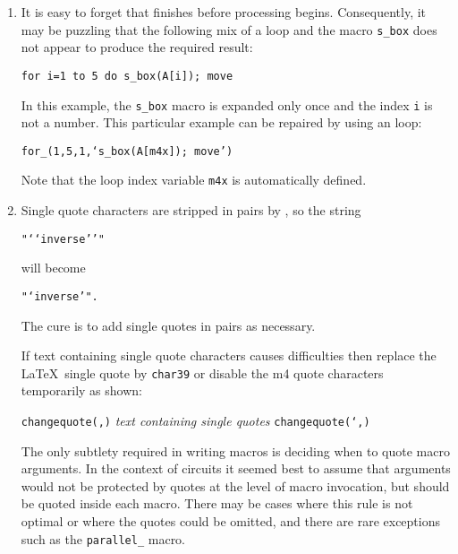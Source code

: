 \begin{enumerate}
{\tt source(0.5)}

\noindent draws a source of length 0.5 units
in the current \pic default direction, which is one of
{\tt right,} {\tt left,} {\tt up,} or {\tt down.}
The best practice is
to specify both the direction and length of an element, thus:

{\tt source(up\_ elen\_).}

The effect of a \linespec argument is independent of any direction
set using the {\tt Point\_} or similar macros. 
To draw an element at an obtuse angle (see ) try,
for example,

{\tt Point\_(45); source(to rvec\_(0.5,0))}

\item 
{}
It is easy to forget that \Mfour finishes before \pic processing
begins. Consequently, it may be puzzling that the following mix of
a \pic loop and the \Mfour macro {\tt s\_box} does not appear to produce
the required result:

{\tt for i=1 to 5 do \lbr s\_box(A[i]); move \rbr}

\noindent In this example, the {\tt s\_box} macro is expanded only once
and the index {\tt i} is not a number.  This particular example can be
repaired by using an \Mfour loop:

{\tt for\_(1,5,1,`s\_box(A[m4x]); move')}

Note that the loop index variable {\tt m4x} is automatically defined.

\item 
{}
 Single quote characters are stripped in pairs by \Mfour, so the string

{\tt "{`}{`}inverse{'}{'}"}

\noindent will become

{\tt "{`}inverse{'}".}

\noindent The cure is to add single quotes in pairs as necessary.

  If text containing single quote characters causes difficulties
  then replace the \LaTeX\ single quote by {\tt \bsl{}char39} 
  or disable the m4 quote characters temporarily as shown:  

  {\tt changequote(,)} {\sl text containing single quotes} {\tt changequote(`,)}
  
  The only subtlety required in writing
  \Mfour macros is deciding when to quote macro arguments.  In the context
  of circuits it seemed best to assume that arguments would not
  be protected by quotes at the level of macro invocation, but should
  be quoted inside each macro.  There may be cases where this rule is
  not optimal or where the quotes could be omitted, and there are
  rare exceptions such as the {\tt parallel\_} macro.


\end{enumerate}
